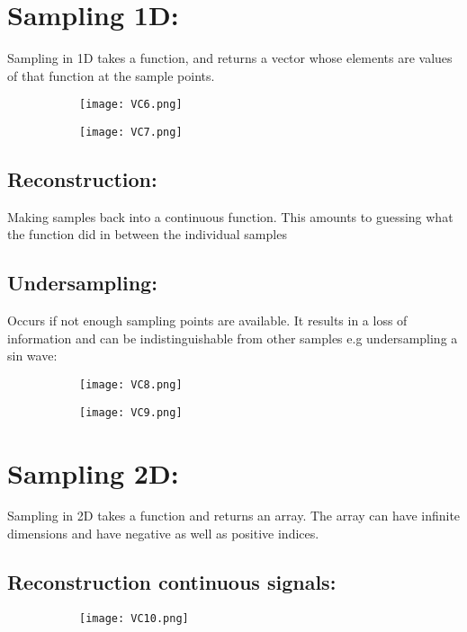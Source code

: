 \documentclass[8pt]{extreport}
\begin{document}
\section{Sampling 1D:}

Sampling in 1D takes a function, and returns a vector whose elements are values of that function at the sample points.

\begin{figure}[H]
\centering
\begin{subfigure}[b]{0.3\linewidth}
\texttt{[image: VC6.png]}
\end{subfigure}
\begin{subfigure}[b]{0.3\linewidth}
\texttt{[image: VC7.png]}
\end{subfigure}
\end{figure}
\subsection{Reconstruction:} Making samples back into a continuous function. This amounts to guessing what the function did in between the individual samples

\subsection{Undersampling:} Occurs if not enough sampling points are available. It results in a loss of information and can be indistinguishable from other samples e.g undersampling a sin wave:
\begin{figure}[H]
\centering
\begin{subfigure}[b]{0.3\linewidth}
\texttt{[image: VC8.png]}
\end{subfigure}
\begin{subfigure}[b]{0.3\linewidth}
\texttt{[image: VC9.png]}
\end{subfigure}
\end{figure}


\section{Sampling 2D:}

Sampling in 2D takes a function and returns an array. The array can have infinite dimensions and have negative as well as positive indices.

\subsection{Reconstruction continuous signals:}
\begin{figure}[H]
\centering
\begin{subfigure}[b]{0.3\linewidth}
\texttt{[image: VC10.png]}
\end{subfigure}

\end{figure}
\end{document}
